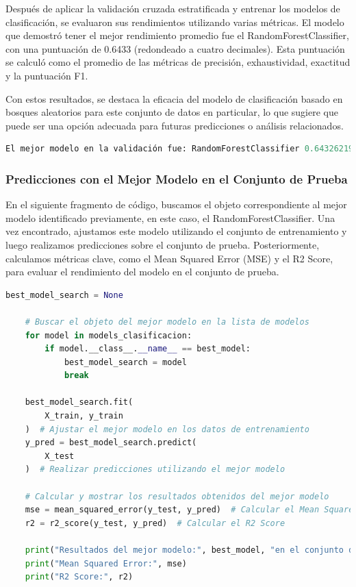 Después de aplicar la validación cruzada estratificada y entrenar los modelos de clasificación, se evaluaron sus rendimientos utilizando varias métricas. El modelo que demostró tener el mejor rendimiento promedio fue el RandomForestClassifier, con una puntuación de 0.6433 (redondeado a cuatro decimales). Esta puntuación se calculó como el promedio de las métricas de precisión, exhaustividad, exactitud y la puntuación F1.

Con estos resultados, se destaca la eficacia del modelo de clasificación basado en bosques aleatorios para este conjunto de datos en particular, lo que sugiere que puede ser una opción adecuada para futuras predicciones o análisis relacionados.

\begin{lstlisting}[language=Python, caption=Resultado Mejor modelo en la Validacion de Clasificación, label=lst:rest_bestModelClasification]
    El mejor modelo en la validación fue: RandomForestClassifier 0.6432621955500205
    \end{lstlisting}




\subsubsection{Predicciones con el Mejor Modelo en el Conjunto de Prueba}

En el siguiente fragmento de código, buscamos el objeto correspondiente al mejor modelo identificado previamente, en este caso, el RandomForestClassifier. Una vez encontrado, ajustamos este modelo utilizando el conjunto de entrenamiento y luego realizamos predicciones sobre el conjunto de prueba. Posteriormente, calculamos métricas clave, como el Mean Squared Error (MSE) y el R2 Score, para evaluar el rendimiento del modelo en el conjunto de prueba.

\begin{lstlisting}[language=Python, caption=Predicciones y evaluación del mejor modelo, label=lst:prediccion_mejor_modelo]
    best_model_search = None

    # Buscar el objeto del mejor modelo en la lista de modelos
    for model in models_clasificacion:
        if model.__class__.__name__ == best_model:
            best_model_search = model
            break
    
    best_model_search.fit(
        X_train, y_train
    )  # Ajustar el mejor modelo en los datos de entrenamiento
    y_pred = best_model_search.predict(
        X_test
    )  # Realizar predicciones utilizando el mejor modelo
    
    # Calcular y mostrar los resultados obtenidos del mejor modelo
    mse = mean_squared_error(y_test, y_pred)  # Calcular el Mean Squared Error
    r2 = r2_score(y_test, y_pred)  # Calcular el R2 Score
    
    print("Resultados del mejor modelo:", best_model, "en el conjunto de prueba:")
    print("Mean Squared Error:", mse)
    print("R2 Score:", r2)
    \end{lstlisting}

